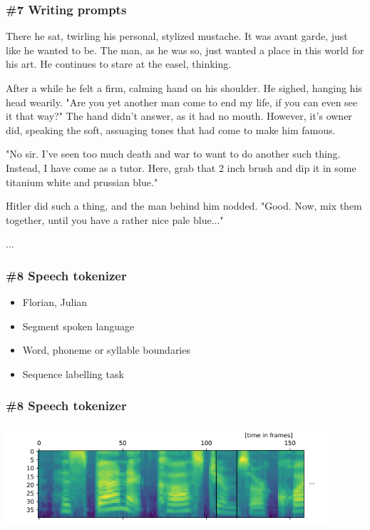 \documentclass{beamer}
\begin{document}
\begin{frame}[fragile]
\frametitle{\#7 Writing prompts}
  \begin{footnotesize}
There he sat, twirling his personal, stylized mustache. It was avant garde, just like he wanted to be. The man, as he was so, just wanted a place in this world for his art. He continues to stare at the easel, thinking.


After a while he felt a firm, calming hand on his shoulder. He sighed, hanging his head wearily. "Are you yet another man come to end my life, if you can even see it that way?" The hand didn't answer, as it had no mouth. However, it's owner did, speaking the soft, assuaging tones that had come to make him famous.


"No sir. I've seen too much death and war to want to do another such thing. Instead, I have come as a tutor. Here, grab that 2 inch brush and dip it in some titanium white and prussian blue."


Hitler did such a thing, and the man behind him nodded. "Good. Now, mix them together, until you have a rather nice pale blue..."

...
  \end{footnotesize}
\end{frame}

\begin{frame}
\frametitle{\#8 Speech tokenizer}
 \begin{itemize}
    \item Florian, Julian
    \item Segment spoken language
    \item Word, phoneme or syllable boundaries
    \item Sequence labelling task
 \end{itemize}
\end{frame}

\begin{frame}[fragile]
\frametitle{\#8 Speech tokenizer}
    \begin{center}
  		\includegraphics[width=0.9\textwidth]{speech_example}
  	\end{center}
\end{frame}
\end{document}
